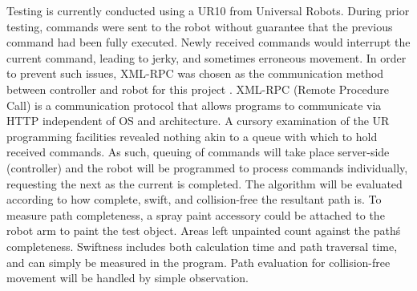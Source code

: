 \documentclass[a4paper, 10pt]{article}
\begin{document}
Testing is currently conducted using a UR10 from Universal Robots.
During prior testing, commands were sent to the robot without guarantee that the previous command had been fully executed.
Newly received commands would interrupt the current command, leading to jerky, and sometimes erroneous movement.
In order to prevent such issues, XML-RPC was chosen as the communication method between controller and robot for this project \cite{UR_XML-RPC}.
XML-RPC (Remote Procedure Call) is a communication protocol that allows programs to communicate via HTTP independent of OS and architecture.
A cursory examination of the UR programming facilities revealed nothing akin to a queue with which to hold received commands.
As such, queuing of commands will take place server-side (controller) and the robot will be programmed to process commands individually, requesting the next as the current is completed.
The algorithm will be evaluated according to how complete, swift, and collision-free the resultant path is.
To measure path completeness, a spray paint accessory could be attached to the robot arm to paint the test object.
Areas left unpainted count against the pathś completeness.
Swiftness includes both calculation time and path traversal time, and can simply be measured in the program.
Path evaluation for collision-free movement will be handled by simple observation.
\end{document}
